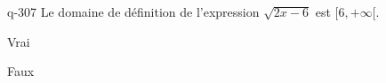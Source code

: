 \begin{truefalse}{q-307}
Le domaine de définition de l'expression $\sqrt{2x-6}$ est $[6,+\infty[$.
\item Vrai
\item* Faux
\end{truefalse}

